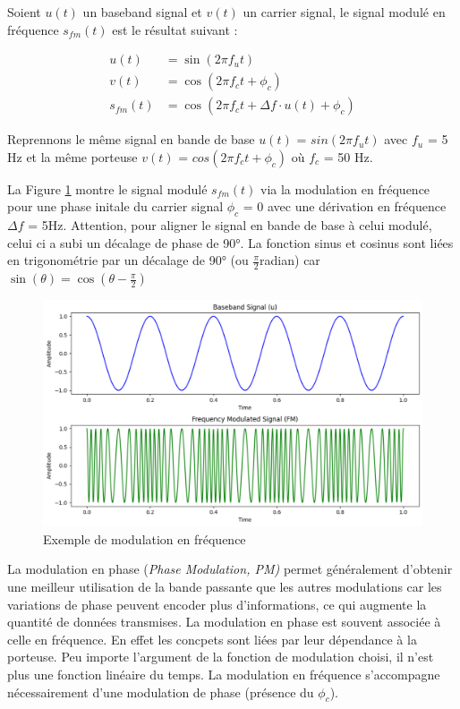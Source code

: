 Soient $u(t)$ un baseband signal et $v(t)$ un carrier signal, le signal modulé en fréquence $s_{fm}(t)$ est le résultat suivant :

\begin{align}
    u(t) &= \sin(2\pi f_{u}t) \\
    v(t) &= \cos(2\pi f_{c}t + \phi_{c}) \\
    s_{fm}(t) &= \cos\left(2\pi f_{c}t + \Delta f \cdot u(t) + \phi_{c}\right)
\end{align}

\vspace{0.1cm}

Reprennons le même signal en bande de base 
$u(t)$ = $sin(2\pi f_{u}t)$ avec $f_{u}$ = 5 Hz et la même porteuse 
$v(t)$ = $cos(2\pi f_{c}t + \phi_{c})$ où $f_{c}$ = 50 Hz.

\vspace{0.1cm}

La Figure \ref{term2} montre le signal modulé $s_{fm}(t)$ via la modulation en fréquence pour une phase initale du carrier signal $\phi_{c}$ = 0 avec une dérivation en fréquence $\Delta f$ = 5Hz. Attention, pour aligner le signal en bande de base à celui modulé, celui ci a subi un décalage de phase de 90°. La fonction sinus et cosinus sont liées en trigonométrie par un décalage de 90° (ou $\frac{\pi}{2} $radian) car $\sin(\theta) = \cos(\theta-\frac{\pi}{2})$

\newpage

\begin{figure}[h]
\centering

\includegraphics[scale=0.5]{images/FM_mod.PNG}
\caption{Exemple de modulation en fréquence}\label{term2}
\end{figure}

La modulation en phase (\textit{Phase Modulation, PM)} permet généralement d'obtenir une meilleur utilisation de la bande passante que les autres modulations car les variations de phase peuvent encoder plus d'informations, ce qui augmente la quantité de données transmises. La modulation en phase est souvent associée à celle en fréquence. En effet les concpets sont liées par leur dépendance à la porteuse. Peu importe l'argument de la fonction de modulation choisi, il n'est plus une fonction linéaire du temps. La modulation en fréquence s'accompagne nécessairement d'une modulation de phase (présence du $\phi_{c}$).

